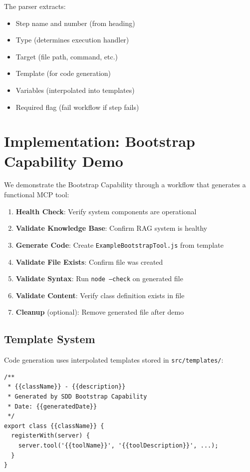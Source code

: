 \documentclass[11pt,letterpaper]{article}
\begin{document}
The parser extracts:
\begin{itemize}
    \item Step name and number (from heading)
    \item Type (determines execution handler)
    \item Target (file path, command, etc.)
    \item Template (for code generation)
    \item Variables (interpolated into templates)
    \item Required flag (fail workflow if step fails)
\end{itemize}

\section{Implementation: Bootstrap Capability Demo}

We demonstrate the Bootstrap Capability through a workflow that generates a functional MCP tool:

\begin{enumerate}
    \item \textbf{Health Check}: Verify system components are operational
    \item \textbf{Validate Knowledge Base}: Confirm RAG system is healthy
    \item \textbf{Generate Code}: Create \texttt{ExampleBootstrapTool.js} from template
    \item \textbf{Validate File Exists}: Confirm file was created
    \item \textbf{Validate Syntax}: Run \texttt{node --check} on generated file
    \item \textbf{Validate Content}: Verify class definition exists in file
    \item \textbf{Cleanup} (optional): Remove generated file after demo
\end{enumerate}

\subsection{Template System}

Code generation uses interpolated templates stored in \texttt{src/templates/}:

\begin{lstlisting}[caption={Template Variable Interpolation}]
/**
 * {{className}} - {{description}}
 * Generated by SDD Bootstrap Capability
 * Date: {{generatedDate}}
 */
export class {{className}} {
  registerWith(server) {
    server.tool('{{toolName}}', '{{toolDescription}}', ...);
  }
}
\end{lstlisting}
\end{document}

